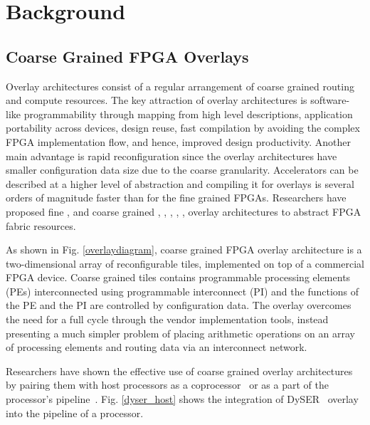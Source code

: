 \chapter{Background}
\label{ch2_background}

\section{Coarse Grained FPGA Overlays}
Overlay architectures consist of a regular arrangement of coarse grained routing and compute resources. The key attraction of overlay architectures is software-like programmability through mapping from high level descriptions, application portability across devices, design reuse, fast compilation by avoiding the complex FPGA implementation flow, and hence, improved design productivity.
Another main advantage is rapid reconfiguration since the overlay architectures have smaller configuration data size due to the coarse granularity.
Accelerators can be described at a higher level of abstraction and compiling it for overlays is several orders of magnitude faster than for the fine grained FPGAs.
Researchers have proposed fine 
\cite{brant_zuma:_2012}, 
\cite{hubner_heterogeneous_2011} 
and coarse grained 
\cite{plessl_zippy_2005}, 
\cite{bergmann_quku:_2013},
\cite{coole_intermediate_2010},
\cite{capalija_high-performance_2013},
\cite{liu_soft_2013}, 
\cite{heyse_efficient_2013}                  
overlay architectures to abstract FPGA fabric resources.

%


As shown in Fig. \ref{overlaydiagram}, coarse grained FPGA overlay architecture is a two-dimensional array of reconfigurable tiles, implemented on top of a commercial FPGA device.
Coarse grained tiles contains programmable processing elements (PEs) interconnected using programmable interconnect (PI) and the functions of the PE and the PI are controlled by configuration data.
The overlay overcomes the need for a full cycle through the vendor implementation tools, instead presenting a much simpler problem of placing arithmetic operations on an array of processing elements and routing data via an interconnect network.


 
Researchers have shown the effective use of coarse grained overlay architectures by pairing them with host processors as a coprocessor~\cite{cong2014fully,jsps2014-jain} or as a part of the processor's pipeline~\cite{benson2012design}. 
Fig. \ref{dyser_host} shows the integration of DySER~\cite{benson2012design, govindaraju2011dynamically} overlay into the pipeline of a processor.

